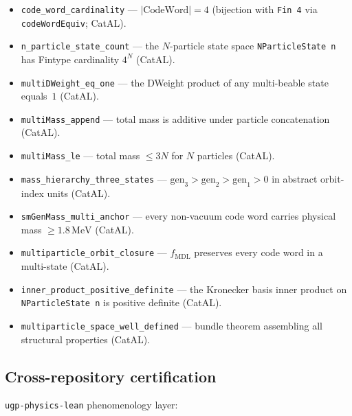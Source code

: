 \documentclass[11pt,a4paper]{article}
\theoremstyle{definition}
\begin{document}
\begin{itemize}[nosep]
\item \lstinline|code_word_cardinality| — $|\mathrm{CodeWord}| = 4$
  (bijection with \lstinline|Fin 4| via \lstinline|codeWordEquiv|; CatAL).
\item \lstinline|n_particle_state_count| — the $N$-particle state space
  \lstinline|NParticleState n| has Fintype cardinality $4^N$ (CatAL).
\item \lstinline|multiDWeight_eq_one| — the DWeight product of any
  multi-beable state equals~$1$ (CatAL).
\item \lstinline|multiMass_append| — total mass is additive under
  particle concatenation (CatAL).
\item \lstinline|multiMass_le| — total mass $\leq 3N$ for $N$ particles
  (CatAL).
\item \lstinline|mass_hierarchy_three_states| — $\mathrm{gen}_3 > \mathrm{gen}_2 >
  \mathrm{gen}_1 > 0$ in abstract orbit-index units (CatAL).
\item \lstinline|smGenMass_multi_anchor| — every non-vacuum code word
  carries physical mass $\geq 1.8\,\mathrm{MeV}$ (CatAL).
\item \lstinline|multiparticle_orbit_closure| — $f_{\mathrm{MDL}}$
  preserves every code word in a multi-state (CatAL).
\item \lstinline|inner_product_positive_definite| — the Kronecker basis
  inner product on \lstinline|NParticleState n| is positive definite (CatAL).
\item \lstinline|multiparticle_space_well_defined| — bundle theorem
  assembling all structural properties (CatAL).
\end{itemize}

\subsection{Cross-repository certification}\label{subsec:cross-repo-certs}
\texttt{ugp-physics-lean} phenomenology layer:
\end{document}
